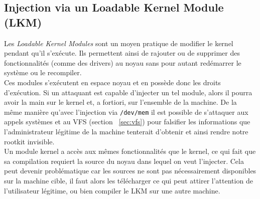 \documentclass[12pt]{article}
\begin{document}

    \subsection{Injection via un Loadable Kernel Module (LKM)}

        Les \textit{Loadable Kernel Modules} sont un moyen pratique de modifier le kernel pendant qu'il s'exécute. Ils permettent ainsi de rajouter ou de supprimer des fonctionnalités (comme des drivers) au noyau sans pour autant redémarrer le système ou le recompiler. \\
        
        Ces modules s'exécutent en espace noyau et en possède donc les droits d'exécution. Si un attaquant est capable d'injecter un tel module, alors il pourra avoir la main sur le kernel et, a fortiori, sur l'ensemble de la machine. De la même manière qu'avec l'injection via \texttt{/dev/mem} il est possible de s'attaquer aux appels systèmes et au VFS (section ~\ref{sec:vfs}) pour falsifier les informations que l'administrateur légitime de la machine tenterait d'obtenir et ainsi rendre notre rootkit invisible. \\
        
        Un module kernel a accès aux mêmes fonctionnalités que le kernel, ce qui fait que sa compilation requiert la source du noyau dans lequel on veut l'injecter. Cela peut devenir problématique car les sources ne sont pas nécessairement disponibles sur la machine cible, il faut alors les télécharger ce qui peut attirer l'attention de l'utilisateur légitime, ou bien compiler le LKM sur une autre machine. \\
        
\end{document}
